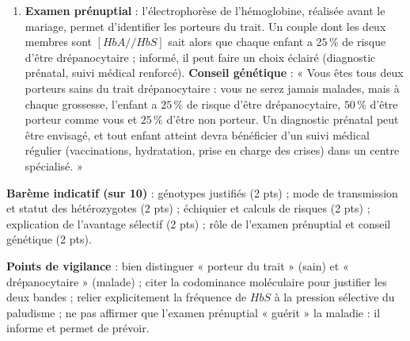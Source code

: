\documentclass[11pt]{article}
\begin{document}
\begin{corrige}
\begin{enumerate}
\item \textbf{Examen prénuptial} : l'électrophorèse de l'hémoglobine, réalisée avant le mariage, permet d'identifier les porteurs du trait. Un couple dont les deux membres sont $[HbA//HbS]$ sait alors que chaque enfant a $25\,\%$ de risque d'être drépanocytaire ; informé, il peut faire un choix éclairé (diagnostic prénatal, suivi médical renforcé). \textbf{Conseil génétique} : « Vous êtes tous deux porteurs sains du trait drépanocytaire : vous ne serez jamais malades, mais à chaque grossesse, l'enfant a $25\,\%$ de risque d'être drépanocytaire, $50\,\%$ d'être porteur comme vous et $25\,\%$ d'être non porteur. Un diagnostic prénatal peut être envisagé, et tout enfant atteint devra bénéficier d'un suivi médical régulier (vaccinations, hydratation, prise en charge des crises) dans un centre spécialisé. »
\end{enumerate}
\textbf{Barème indicatif (sur 10)} : génotypes justifiés (2 pts) ; mode de transmission et statut des hétérozygotes (2 pts) ; échiquier et calculs de risques (2 pts) ; explication de l'avantage sélectif (2 pts) ; rôle de l'examen prénuptial et conseil génétique (2 pts).\par
\textbf{Points de vigilance} : bien distinguer « porteur du trait » (sain) et « drépanocytaire » (malade) ; citer la codominance moléculaire pour justifier les deux bandes ; relier explicitement la fréquence de $HbS$ à la pression sélective du paludisme ; ne pas affirmer que l'examen prénuptial « guérit » la maladie : il informe et permet de prévoir.
\end{corrige}
\end{document}
